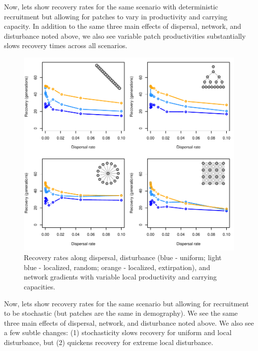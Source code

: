 \documentclass[]{article}
\begin{document}
Now, lets show recovery rates for the same scenario with deterministic
recruitment but allowing for patches to vary in productivity and
carrying capacity. In addition to the same three main effects of
dispersal, network, and disturbance noted above, we also see variable
patch productivities substantially slows recovery times across all
scenarios.

\begin{figure}[H]

{\centering \includegraphics{Managing_for_ecological_surprises_in_metapopulations_makeHTML_files/figure-latex/results for variables patches-1} 

}

\caption{Recovery rates along dispersal, disturbance (blue - uniform; light blue - localized, random; orange - localized, extirpation), and network gradients with variable local productivity and carrying capacities.}\label{fig:results for variables patches}
\end{figure}

Now, lets show recovery rates for the same scenario but allowing for
recruitment to be stochastic (but patches are the same in demography).
We see the same three main effects of dispersal, network, and
disturbance noted above. We also see a few subtle changes: (1)
stochasticity slows recovery for uniform and local disturbance, but (2)
quickens recovery for extreme local disturbance.
\end{document}
